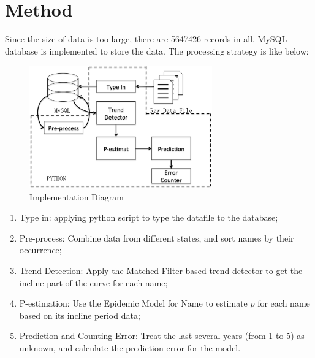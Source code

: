 \documentclass[journal]{IEEEtran}
\begin{document}
\section{Method} %
\label{sec:method}
Since the size of data is too large, there are 5647426 records in all, MySQL\cite{mysql2001mysql} database is implemented to store the data. The processing strategy is like below:
\begin{figure}[ht]
	\centering
	\includegraphics[width = 3.1in]{figure/implementation.png}
	\caption{Implementation Diagram}
	\label{fig:Implementation Diagram}
\end{figure}
\begin{enumerate}
	\item Type in: applying python script to type the datafile to the database;
	\item Pre-process: Combine data from different states, and sort names by their occurrence;
	\item Trend Detection: Apply the Matched-Filter based trend detector to get the incline part of the curve for each name;
	\item P-estimation: Use the Epidemic Model for Name to estimate $p$ for each name based on its incline period data;
	\item Prediction and Counting Error: Treat the last several years (from 1 to 5) as unknown, and calculate the prediction error for the model.
\end{enumerate}

\end{document}
